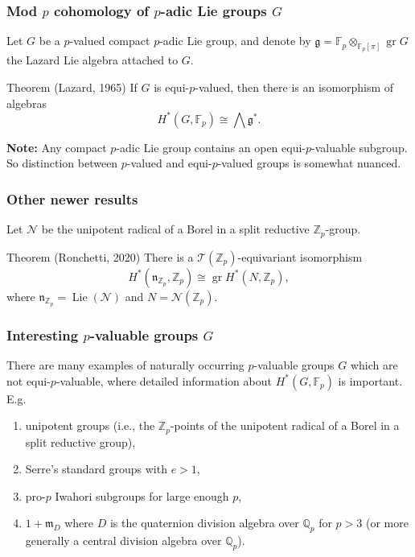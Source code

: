 \documentclass{beamer}
\newcommand*\Z{\mathbb{Z}}
\newcommand*\Q{\mathbb{Q}}
\newcommand*\F{\mathbb{F}}
\DeclareMathOperator{\gr}{gr} %
\DeclareMathOperator{\Lie}{Lie}
\newcommand*{\lie}[1]{\mathfrak{#1}} %
\newcommand*\iso{\cong} %
\newcommand*\idm{\mathfrak{m}}
\newcommand*\gs[1]{\mathcal{#1}}
\begin{document}
\begin{frame}
  \frametitle{Mod $p$ cohomology of $p$-adic Lie groups $G$}

  Let $G$ be a $p$-valued compact $p$-adic Lie group, and denote by $\lie{g} = \F_{p} \otimes_{\F_{p}[\pi]} \gr G$ the Lazard Lie algebra attached to $G$.

  \begin{block}{Theorem (Lazard, 1965)}
    If $G$ is equi-$p$-valued, then there is an isomorphism of algebras \[ H^{*}(G,\F_{p}) \iso \bigwedge \lie{g}^{*}. \]
  \end{block}

  \pause

  \textbf{Note:} Any compact $p$-adic Lie group contains an open equi-$p$-valuable subgroup. So distinction between $p$-valued and equi-$p$-valued groups is somewhat nuanced.
\end{frame}


\begin{frame}
  \frametitle{Other newer results}

  Let $\gs{N}$ be the unipotent radical of a Borel in a split reductive $\Z_{p}$-group.

  \begin{block}{Theorem (Ronchetti, 2020)}
    There is a $\gs{T}(\Z_p)$-equivariant isomorphism
    \[
      H^*(\lie{n}_{\Z_p},\Z_p) \iso \gr H^*(N,\Z_p),
    \]
    where $\lie{n}_{\Z_p} = \Lie(\gs{N})$ and $N = \gs{N}(\Z_p)$.
  \end{block}
\end{frame}

\begin{frame}
  \frametitle{Interesting $p$-valuable groups $G$}

  There are many examples of naturally occurring $p$-valuable groups $G$ which are not equi-$p$-valuable, where detailed information about $H^{*}(G,\F_{p})$ is important. E.g.
  \begin{enumerate}[$\bullet$]
    \item unipotent groups (i.e., the $\Z_{p}$-points of the unipotent radical of a Borel in a split reductive group),
    \item Serre's standard groups with $e>1$,
    \item pro-$p$ Iwahori subgroups for large enough $p$,
    \item $1+\idm_{D}$ where $D$ is the quaternion division algebra over $\Q_{p}$ for $p>3$ (or more generally a central division algebra over $\Q_{p}$).
  \end{enumerate}
\end{frame}
\end{document}
